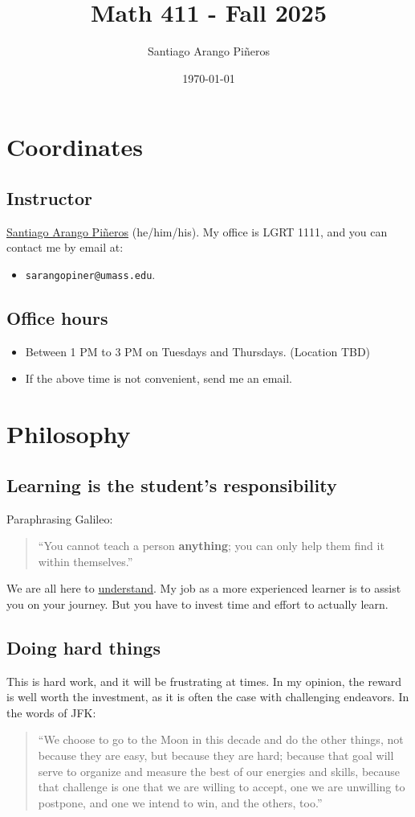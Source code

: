 \documentclass[11pt]{article}
\author{Santiago Arango Piñeros}
\date{\today}
\title{Math 411 - Fall 2025}
\begin{document}
\maketitle
\tableofcontents


\section{Coordinates}
\label{sec:orga39e2ff}
\subsection{Instructor}
\label{sec:orgc0dc398}
\href{https://sarangop1728.github.io/}{Santiago Arango Piñeros} (he/him/his).
My office is LGRT 1111, and you can contact me by email at:
\begin{itemize}
\item \texttt{sarangopiner@umass.edu}.
\end{itemize}
\subsection{Office hours}
\label{sec:orga330084}
\begin{itemize}
\item Between 1 PM to 3 PM on Tuesdays and Thursdays. (Location TBD)
\item If the above time is not convenient, send me an email.
\end{itemize}

\section{Philosophy}
\label{sec:orgec92315}
\subsection{Learning is the student's responsibility}
\label{sec:orge8fa670}
Paraphrasing Galileo:
\begin{quote}
``You cannot teach a person \textbf{anything}; you can only help
them find it within themselves.''
\end{quote}
We are all here to \uline{understand}. My job as a
more experienced learner is to assist you on your journey. But you have to
invest time and effort to actually learn.
\subsection{Doing hard things}
\label{sec:orgc8534be}
This is hard work, and it will be frustrating at times. In my opinion, the
reward is well worth the investment, as it is often the case with challenging
endeavors. In the words of JFK:
\begin{quote}
``We choose to go to the Moon in this decade and do the other things, not
because they are easy, but because they are hard; because that goal will serve
to organize and measure the best of our energies and skills, because that
challenge is one that we are willing to accept, one we are unwilling to
postpone, and one we intend to win, and the others, too.''
\end{quote}
\end{document}
